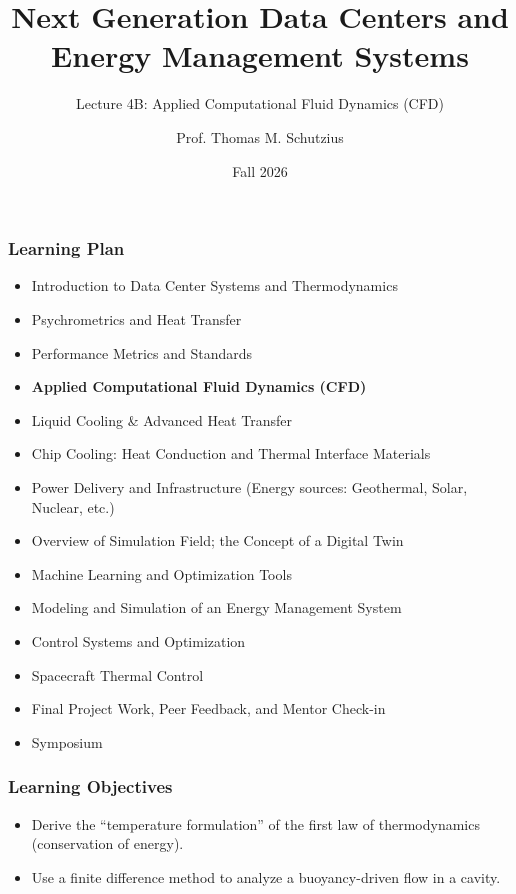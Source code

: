 \documentclass[aspectratio=169,10pt,xcolor={table,dvipsnames},t]{beamer}
\title[lecture 02]{Next Generation Data Centers and Energy Management Systems}
\subtitle{Lecture 4B: Applied Computational Fluid Dynamics (CFD)}
\author{Prof. Thomas M. Schutzius}
\institute{Department of Mechanical Engineering}
\date{Fall 2026}
\begin{document}
\begin{frame}
  \titlepage
\end{frame}


{
\smallframetitle
	\begin{frame}
		\frametitle{Learning Plan}
		\begin{itemize}
			\item Introduction to Data Center Systems and Thermodynamics 
			\item Psychrometrics and Heat Transfer
			\item Performance Metrics and Standards
			\item \textbf{Applied Computational Fluid Dynamics (CFD)}
			\item Liquid Cooling \& Advanced Heat Transfer 
			\item Chip Cooling: Heat Conduction and Thermal Interface Materials 
			\item Power Delivery and Infrastructure (Energy sources: Geothermal, Solar, Nuclear, etc.)
			\item Overview of Simulation Field; the Concept of a Digital Twin 
			\item Machine Learning and Optimization Tools 
			\item Modeling and Simulation of an Energy Management System 
			\item Control Systems and Optimization 
			\item Spacecraft Thermal Control
			\item Final Project Work, Peer Feedback, and Mentor Check-in 
			\item Symposium 
		\end{itemize}		
	\end{frame}
}

{
\smallframetitle
	\begin{frame}
		\frametitle{Learning Objectives}
		\begin{itemize}
			\item Derive the ``temperature formulation'' of the first law of thermodynamics (conservation of energy).
			\item Use a finite difference method to analyze a buoyancy-driven flow in a cavity.
		\end{itemize}		
	\end{frame}
}
\end{document}
